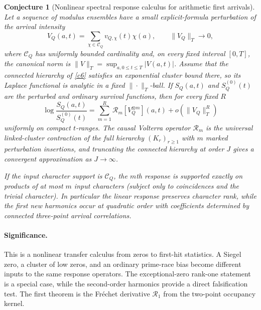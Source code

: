 \documentclass[11pt]{article}
\newtheorem{conjecture}{Conjecture}
\begin{document}
\begin{conjecture}[Nonlinear spectral response calculus for arithmetic first arrivals]\label{c9}
Let a sequence of modulus ensembles have a small explicit-formula perturbation of the
arrival intensity
\[
 V_Q(a,t)=\sum_{\chi\in\mathcal C_Q}v_{Q,\chi}(t)\chi(a),
 \qquad \|V_Q\|_{T}\to0,
\]
where $\mathcal C_Q$ has uniformly bounded cardinality and, on every fixed interval
$[0,T]$, the canonical norm is
$\|V\|_T=\sup_{a,0\le t\le T}|V(a,t)|$.  Assume that the connected hierarchy of
\cref{c6} satisfies an exponential cluster bound there, so its Laplace functional is
analytic in a fixed $\|\cdot\|_T$-ball.  If $S_Q(a,t)$ and
$S_Q^{(0)}(t)$ are the perturbed and ordinary survival functions, then for every fixed
$R$
\[
 \log\frac{S_Q(a,t)}{S_Q^{(0)}(t)}
 =\sum_{m=1}^{R}\mathcal R_m[V_Q^{\otimes m}](a,t)
   +o(\|V_Q\|_{T}^{R})
\]
uniformly on compact $t$-ranges.  The causal Volterra operator $\mathcal R_m$ is the
universal linked-cluster contraction of the full hierarchy $(K_r)_{r\ge1}$ with $m$
marked perturbation insertions, and truncating the connected hierarchy at order $J$
gives a convergent approximation as $J\to\infty$.

If the input character support is $\mathcal C_Q$, the $m$th response is supported exactly
on products of at most $m$ input characters (subject only to coincidences and the trivial
character).  In particular the linear response preserves character rank, while the first
new harmonics occur at quadratic order with coefficients determined by connected
three-point arrival correlations.
\end{conjecture}

\paragraph{Significance.}
This is a nonlinear transfer calculus from zeros to first-hit statistics.  A Siegel zero,
a cluster of low zeros, and an ordinary prime-race bias become different inputs to the
same response operators.  The exceptional-zero rank-one statement is a special case,
while the second-order harmonics provide a direct falsification test.  The first theorem
is the Fr\'echet derivative $\mathcal R_1$ from the two-point occupancy kernel.
\end{document}
